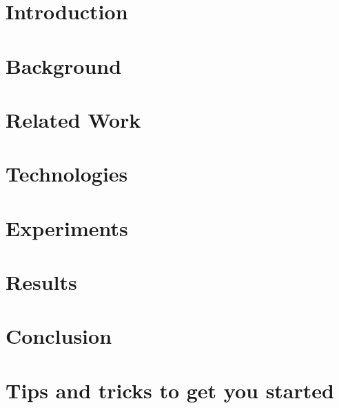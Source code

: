 \documentclass[english, a4paper, 11pt, twoside]{article}
\numberwithin{equation}{section} %
\begin{document}
\section{Introduction} %
\clearpage %

\section{Background}
    
\clearpage

\section{Related Work}
    
\clearpage

\section{Technologies}
    
\clearpage
  
\section{Experiments}
    
\clearpage

\section{Results}
    
\clearpage

\section{Conclusion}
    
\clearpage

\newpage
\renewcommand\refname{References} %
{ %
}

\newpage
\renewcommand{\appendixpagename}{Appendix} %
\renewcommand{\appendixtocname}{Appendix} %
\appendixpage 
\addappheadtotoc

\begin{appendices}
    
\end{appendices}

\newpage
\section{Tips and tricks to get you started}
    
\end{document}
